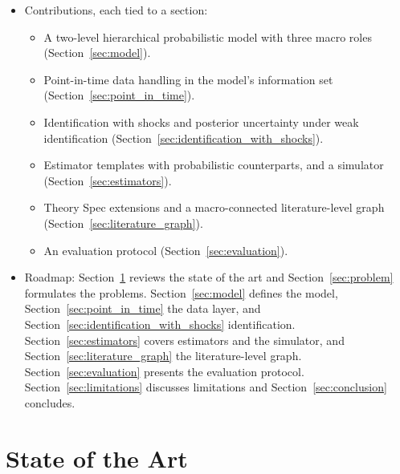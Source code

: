 \begin{itemize}
    \begin{itemize}
    \tightlist
    \item
      \textbf{Macro layer exogenous to firms.} Edges run from macro to
      firm, not the reverse.
    \item
      \textbf{Public macro data only.} FRED-MD, FRED-QD, and ALFRED.
    \item
      \textbf{Linear-Gaussian components first.} Nonlinear and
      heavy-tailed variants are deferred.
    \end{itemize}
  \item
    Contributions, each tied to a section:

    \begin{itemize}
    \tightlist
    \item
      A two-level hierarchical probabilistic model with three macro roles
      (Section~\ref{sec:model}).
    \item
      Point-in-time data handling in the model's information set
      (Section~\ref{sec:point_in_time}).
    \item
      Identification with shocks and posterior uncertainty under weak
      identification (Section~\ref{sec:identification_with_shocks}).
    \item
      Estimator templates with probabilistic counterparts, and a simulator
      (Section~\ref{sec:estimators}).
    \item
      Theory Spec extensions and a macro-connected literature-level graph
      (Section~\ref{sec:literature_graph}).
    \item
      An evaluation protocol (Section~\ref{sec:evaluation}).
    \end{itemize}
  \item
    Roadmap: Section~\ref{sec:state_of_the_art} reviews the state of the art
    and Section~\ref{sec:problem} formulates the problems.
    Section~\ref{sec:model} defines the model,
    Section~\ref{sec:point_in_time} the data layer, and
    Section~\ref{sec:identification_with_shocks} identification.
    Section~\ref{sec:estimators} covers estimators and the simulator, and
    Section~\ref{sec:literature_graph} the literature-level graph.
    Section~\ref{sec:evaluation} presents the evaluation protocol.
    Section~\ref{sec:limitations} discusses limitations and
    Section~\ref{sec:conclusion} concludes.
  \end{itemize}

  \section{State of the Art}\label{sec:state_of_the_art}

